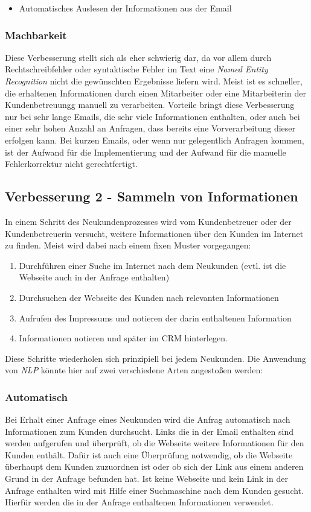 \begin{itemize}
	\item Automatisches Auslesen der Informationen aus der Email
\end{itemize}

\subsubsection{Machbarkeit}
Diese Verbesserung stellt sich als eher schwierig dar, da vor allem durch Rechtschreibfehler oder syntaktische Fehler im Text eine \textit{Named Entity Recognition} nicht die gewünschten Ergebnisse liefern wird. Meist ist es schneller, die erhaltenen Informationen durch einen Mitarbeiter oder eine Mitarbeiterin der Kundenbetreuungg manuell zu verarbeiten. Vorteile bringt diese Verbesserung nur bei sehr lange Emails, die sehr viele Informationen enthalten, oder auch bei einer sehr hohen Anzahl an Anfragen, dass bereits eine Vorverarbeitung dieser erfolgen kann. Bei kurzen Emails, oder wenn nur gelegentlich Anfragen kommen, ist der Aufwand für die Implementierung und der Aufwand für die manuelle Fehlerkorrektur nicht gerechtfertigt.


\subsection{Verbesserung 2 - Sammeln von Informationen}
In einem Schritt des Neukundenprozesses wird vom Kundenbetreuer oder der Kundenbetreuerin versucht, weitere Informationen über den Kunden im Internet zu finden. Meist wird dabei nach einem fixen Muster vorgegangen:

\begin{enumerate}
	\item Durchführen einer Suche im Internet nach dem Neukunden (evtl. ist die Webseite auch in der Anfrage enthalten)
	\item Durchsuchen der Webseite des Kunden nach relevanten Informationen
	\item Aufrufen des Impressums und notieren der darin enthaltenen Information
	\item Informationen notieren und später im CRM hinterlegen.
\end{enumerate}

Diese Schritte wiederholen sich prinzipiell bei jedem Neukunden. Die Anwendung von \textit{NLP} könnte hier auf zwei verschiedene Arten angestoßen werden:

\subsubsection{Automatisch}
Bei Erhalt einer Anfrage eines Neukunden wird die Anfrag automatisch nach Informationen zum Kunden durchsucht. Links die in der Email enthalten sind werden aufgerufen und überprüft, ob die Webseite weitere Informationen für den Kunden enthält. Dafür ist auch eine Überprüfung notwendig, ob die Webseite überhaupt dem Kunden zuzuordnen ist oder ob sich der Link aus einem anderen Grund in der Anfrage befunden hat. Ist keine Webseite und kein Link in der Anfrage enthalten wird mit Hilfe einer Suchmaschine nach dem Kunden gesucht. Hierfür werden die in der Anfrage enthaltenen Informationen verwendet. 

